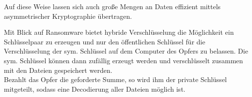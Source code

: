 Auf diese Weise lassen sich auch große Mengen an Daten effizient mittels asymmetrischer Kryptographie übertragen.

Mit Blick auf Ransomware bietet hybride Verschlüsselung die Möglichkeit ein Schlüsselpaar zu erzeugen und nur den öffentlichen Schlüssel für die Verschlüsselung der sym. Schlüssel auf dem Computer des Opfers zu belassen. Die sym. Schlüssel können dann zufällig erzeugt werden und verschlüsselt zusammen mit den Dateien gespeichert werden. \\ Bezahlt das Opfer die geforderte Summe, so wird ihm der private Schlüssel mitgeteilt, sodass eine Decodierung aller Dateien möglich ist.
